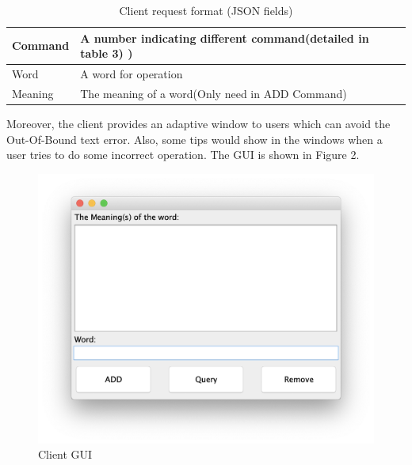 \documentclass[a4paper]{article}
\begin{document}
\begin{table}[H]
	\caption{Client request format (JSON fields)} 
	\begin{tabular}{|l|l|}
		\hline
		Command & A number indicating different command(detailed in table 3)   )                             \\ \hline
		Word & A word for operation                               \\ \hline
		Meaning  & The meaning of a word(Only need in ADD Command)\\ \hline
	\end{tabular}
\end{table}

Moreover, the client provides an adaptive window to users which can avoid the Out-Of-Bound text error. Also, some tips would show in the windows when a user tries to do some incorrect operation. The GUI is shown in Figure 2.

\begin{figure}[H]
	\includegraphics[width=\linewidth]{clientGUI.png}
	\caption{Client GUI}
\end{figure}
\newpage
\end{document}
